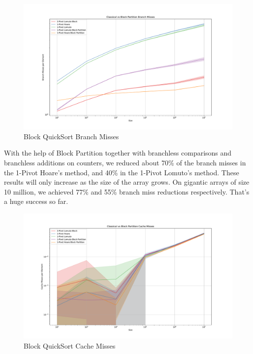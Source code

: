 \documentclass{article}
\begin{document}
\begin{figure}[H]
    \hypertarget{fig:blockbranchmiss}{}
    \caption{Block QuickSort Branch Misses}
    \centering
    \hspace*{-0.27\textwidth}
    \includegraphics[width=1.5\textwidth]{Classical vs Block Partition Branch Misses.pdf}
\end{figure}

With the help of Block Partition together with branchless comparisons and branchless additions on counters, we reduced about 70\% of the branch misses in the 1-Pivot Hoare's method, and 40\% in the 1-Pivot Lomuto's method. These results will only increase as the size of the array grows.
On gigantic arrays of size 10 million, we achieved 77\% and 55\% branch miss reductions respectively. That's a huge success so far.

\begin{figure}[H]
    \hypertarget{fig:blockcachemiss}{}
    \caption{Block QuickSort Cache Misses}
    \centering
    \hspace*{-0.27\textwidth}
    \includegraphics[width=1.5\textwidth]{Classical vs Block Partition Cache Misses.pdf}
\end{figure}
\end{document}
